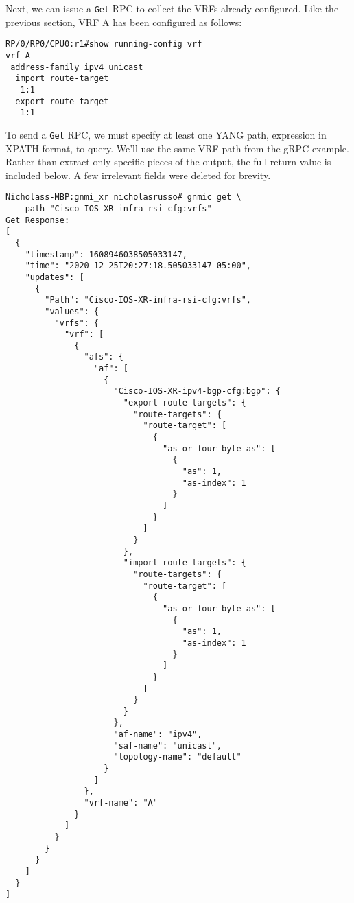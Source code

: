 Next, we can issue a \verb|Get| RPC to collect the VRFs already configured.
Like the previous section, VRF A has been configured as follows:

\begin{verbatim}
RP/0/RP0/CPU0:r1#show running-config vrf
vrf A
 address-family ipv4 unicast
  import route-target
   1:1
  export route-target
   1:1
\end{verbatim}

To send a \verb|Get| RPC, we must specify at least one YANG path, expression
in XPATH format, to query. We'll use the same VRF path from the gRPC example.
Rather than extract only specific pieces of the output, the full return value
is included below. A few irrelevant fields were deleted for brevity.

\begin{verbatim}
Nicholass-MBP:gnmi_xr nicholasrusso# gnmic get \
  --path "Cisco-IOS-XR-infra-rsi-cfg:vrfs"
Get Response:
[
  {
    "timestamp": 1608946038505033147,
    "time": "2020-12-25T20:27:18.505033147-05:00",
    "updates": [
      {
        "Path": "Cisco-IOS-XR-infra-rsi-cfg:vrfs",
        "values": {
          "vrfs": {
            "vrf": [
              {
                "afs": {
                  "af": [
                    {
                      "Cisco-IOS-XR-ipv4-bgp-cfg:bgp": {
                        "export-route-targets": {
                          "route-targets": {
                            "route-target": [
                              {
                                "as-or-four-byte-as": [
                                  {
                                    "as": 1,
                                    "as-index": 1
                                  }
                                ]
                              }
                            ]
                          }
                        },
                        "import-route-targets": {
                          "route-targets": {
                            "route-target": [
                              {
                                "as-or-four-byte-as": [
                                  {
                                    "as": 1,
                                    "as-index": 1
                                  }
                                ]
                              }
                            ]
                          }
                        }
                      },
                      "af-name": "ipv4",
                      "saf-name": "unicast",
                      "topology-name": "default"
                    }
                  ]
                },
                "vrf-name": "A"
              }
            ]
          }
        }
      }
    ]
  }
]
\end{verbatim}

